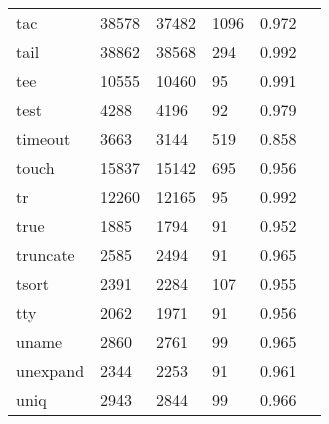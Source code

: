 \begin{longtable}{lp{2.4cm}p{2.4cm}p{2.4cm}p{2.4cm}p{2.4cm}}
tac       &                                   38578 &                       37482 &                         1096 &                                   0.972 \\
tail      &                                   38862 &                       38568 &                          294 &                                   0.992 \\
tee       &                                   10555 &                       10460 &                           95 &                                   0.991 \\
test      &                                    4288 &                        4196 &                           92 &                                   0.979 \\
timeout   &                                    3663 &                        3144 &                          519 &                                   0.858 \\
touch     &                                   15837 &                       15142 &                          695 &                                   0.956 \\
tr        &                                   12260 &                       12165 &                           95 &                                   0.992 \\
true      &                                    1885 &                        1794 &                           91 &                                   0.952 \\
truncate  &                                    2585 &                        2494 &                           91 &                                   0.965 \\
tsort     &                                    2391 &                        2284 &                          107 &                                   0.955 \\
tty       &                                    2062 &                        1971 &                           91 &                                   0.956 \\
uname     &                                    2860 &                        2761 &                           99 &                                   0.965 \\
unexpand  &                                    2344 &                        2253 &                           91 &                                   0.961 \\
uniq      &                                    2943 &                        2844 &                           99 &                                   0.966 \\

\end{longtable}
